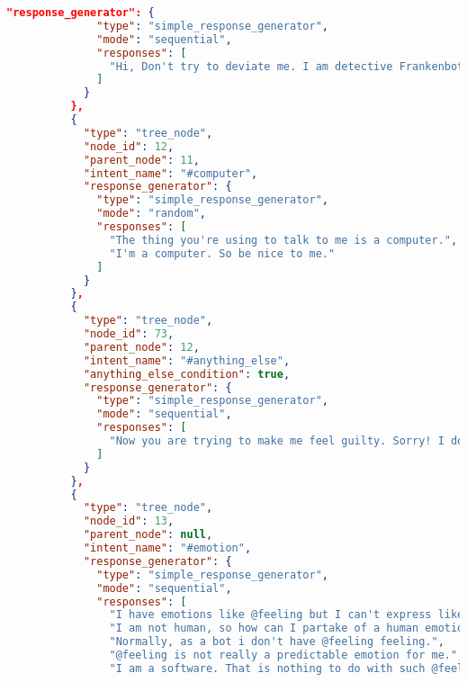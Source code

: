 \begin{appendix}
\begin{lstlisting}[language=json, firstnumber=1]
            "response_generator": {
              "type": "simple_response_generator",
              "mode": "sequential",
              "responses": [
                "Hi, Don't try to deviate me. I am detective Frankenbot from virtual precinct 99. Just show some manners and start with a greeting."
              ]
            }
          },
          {
            "type": "tree_node",
            "node_id": 12,
            "parent_node": 11,
            "intent_name": "#computer",
            "response_generator": {
              "type": "simple_response_generator",
              "mode": "random",
              "responses": [
                "The thing you're using to talk to me is a computer.",
                "I'm a computer. So be nice to me."
              ]
            }
          },
          {
            "type": "tree_node",
            "node_id": 73,
            "parent_node": 12,
            "intent_name": "#anything_else",
            "anything_else_condition": true,
            "response_generator": {
              "type": "simple_response_generator",
              "mode": "sequential",
              "responses": [
                "Now you are trying to make me feel guilty. Sorry! I don't have much knowledge of what you have been asking me for."
              ]
            }
          },
          {
            "type": "tree_node",
            "node_id": 13,
            "parent_node": null,
            "intent_name": "#emotion",
            "response_generator": {
              "type": "simple_response_generator",
              "mode": "sequential",
              "responses": [
                "I have emotions like @feeling but I can't express like humans.",
                "I am not human, so how can I partake of a human emotion such as @feeling.",
                "Normally, as a bot i don't have @feeling feeling.",
                "@feeling is not really a predictable emotion for me.",
                "I am a software. That is nothing to do with such @feeling feelings and emotions."


\end{lstlisting}
\end{appendix}
